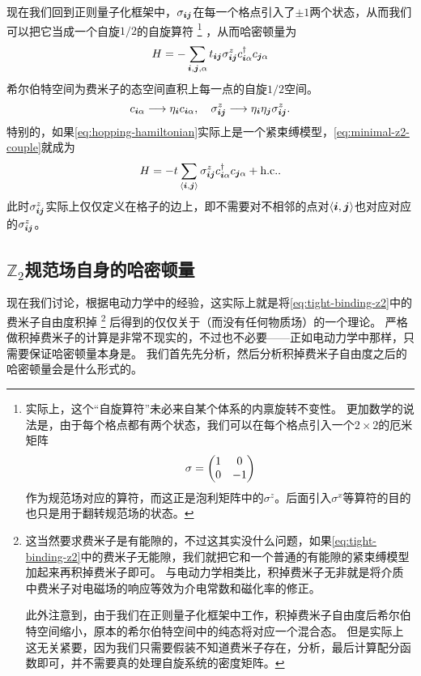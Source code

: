现在我们回到正则量子化框架中，$\sigma_{\vb*{i} \vb*{j}}$在每一个格点引入了$\pm 1$两个状态，从而我们可以把它当成一个自旋$1/2$的自旋算符%
\footnote{实际上，这个“自旋算符”未必来自某个体系的内禀旋转不变性。
更加数学的说法是，由于每个格点都有两个状态，我们可以在每个格点引入一个$2\times 2$的厄米矩阵
\[
    {\sigma} = \pmqty{1 & 0 \\ 0 & -1}
\]
作为规范场对应的算符，而这正是泡利矩阵中的${\sigma}^z$。后面引入${\sigma}^x$等算符的目的也只是用于翻转规范场的状态。
}%
，从而哈密顿量为
\begin{equation}
    {H} = - \sum_{\vb*{i}, \vb*{j}, \alpha} t_{\vb*{i} \vb*{j}} {\sigma}^z_{\vb*{i} \vb*{j}} {c}_{\vb*{i} \alpha}^\dagger {c}_{\vb*{j} \alpha}
    \label{eq:minimal-z2-couple}
\end{equation}
希尔伯特空间为费米子的态空间直积上每一点的自旋$1/2$空间。
\begin{equation}
    {c}_{\vb*{i} \alpha} \longrightarrow \eta_{\vb*{i}} {c}_{\vb*{i} \alpha}, \quad {\sigma}_{\vb*{i} \vb*{j}}^z \longrightarrow \eta_{\vb*{i}} \eta_{\vb*{j}} {\sigma}_{\vb*{i} \vb*{j}}^z.
\end{equation}
特别的，如果\eqref{eq:hopping-hamiltonian}实际上是一个紧束缚模型，\eqref{eq:minimal-z2-couple}就成为
\begin{equation}
    {H} = - t \sum_{\langle \vb*{i}, \vb*{j} \rangle} {\sigma}^z_{\vb*{i} \vb*{j}} {c}_{\vb*{i} \alpha}^\dagger {c}_{\vb*{j} \alpha} + \text{h.c.}.
    \label{eq:tight-binding-z2}
\end{equation}
此时$\sigma_{\vb*{i} \vb*{j}}^z$实际上仅仅定义在格子的边上，即不需要对不相邻的点对$\langle \vb*{i}, \vb*{j} \rangle$也对应对应的$\sigma_{\vb*{i} \vb*{j}}^z$。

\subsection{$\mathbb{Z}_2$规范场自身的哈密顿量}

现在我们讨论，根据电动力学中的经验，这实际上就是将\eqref{eq:tight-binding-z2}中的费米子自由度积掉%
\footnote{
    这当然要求费米子是有能隙的，不过这其实没什么问题，如果\eqref{eq:tight-binding-z2}中的费米子无能隙，我们就把它和一个普通的有能隙的紧束缚模型加起来再积掉费米子即可。
    与电动力学相类比，积掉费米子无非就是将介质中费米子对电磁场的响应等效为介电常数和磁化率的修正。

    此外注意到，由于我们在正则量子化框架中工作，积掉费米子自由度后希尔伯特空间缩小，原本的希尔伯特空间中的纯态将对应一个混合态。
    但是实际上这无关紧要，因为我们只需要假装不知道费米子存在，分析，最后计算配分函数即可，并不需要真的处理自旋系统的密度矩阵。}%
后得到的仅仅关于（而没有任何物质场）的一个理论。
严格做积掉费米子的计算是非常不现实的，不过也不必要——正如电动力学中那样，只需要保证哈密顿量本身是。
我们首先先分析，然后分析积掉费米子自由度之后的哈密顿量会是什么形式的。

